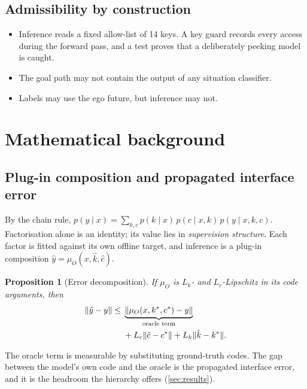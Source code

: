 \documentclass[10pt,twocolumn]{article}
\newtheorem{proposition}{Proposition}
\theoremstyle{remark}
\begin{document}
\subsection{Admissibility by construction}
\begin{itemize}
  \item Inference reads a fixed allow-list of 14 keys. A key guard records every access during the forward pass, and a test proves
        that a deliberately peeking model is caught.
  \item The goal path may not contain the output of any situation classifier.
  \item Labels may use the ego future, but inference may not.
\end{itemize}

\section{Mathematical background}\label{sec:math}

\subsection{Plug-in composition and propagated interface error}
By the chain rule, $p(y\mid x)=\sum_{k,c}p(k\mid x)\,p(c\mid x,k)\,p(y\mid x,k,c)$. Factorisation alone is an identity; its value lies in
\emph{supervision structure}. Each factor is fitted against its own offline target, and inference is a plug-in composition
$\hat y=\mu_O(x,\hat k,\hat c)$.
\begin{proposition}[Error decomposition]\label{prop:lip}
If $\mu_O$ is $L_k$- and $L_c$-Lipschitz in its code arguments, then
\begin{equation}
\begin{aligned}
\|\hat y-y\|\le{}&\underbrace{\|\mu_O(x,k^\ast,c^\ast)-y\|}_{\textup{oracle term}}\\
&+L_c\|\hat c-c^\ast\|+L_k\|\hat k-k^\ast\| .
\end{aligned}
\end{equation}
\end{proposition}
\noindent The oracle term is measurable by substituting ground-truth codes. The gap between the model's own code and the oracle is
the propagated interface error, and it is the headroom the hierarchy offers (\cref{sec:results}).
\end{document}
